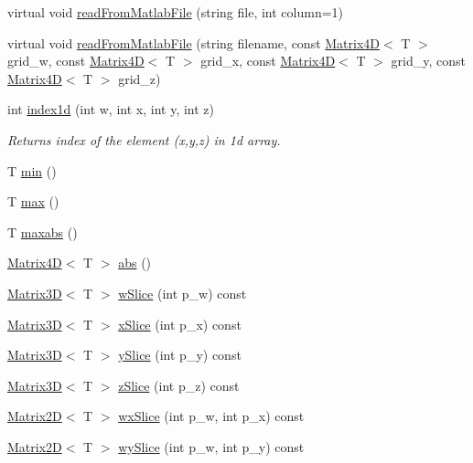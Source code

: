 \begin{DoxyCompactItemize}
\item 
virtual void \hyperlink{class_matrix4_d_af931115c686508ca52ba31085aac6cda}{read\+From\+Matlab\+File} (string file, int column=1)
\item 
virtual void \hyperlink{class_matrix4_d_ae53e29f2daa8b6c2e8f0e9f423e3ec4d}{read\+From\+Matlab\+File} (string filename, const \hyperlink{class_matrix4_d}{Matrix4\+D}$<$ T $>$ grid\+\_\+w, const \hyperlink{class_matrix4_d}{Matrix4\+D}$<$ T $>$ grid\+\_\+x, const \hyperlink{class_matrix4_d}{Matrix4\+D}$<$ T $>$ grid\+\_\+y, const \hyperlink{class_matrix4_d}{Matrix4\+D}$<$ T $>$ grid\+\_\+z)
\item 
int \hyperlink{class_matrix4_d_a6e43a921bf8b175fa8c5dac4f7cde2b0}{index1d} (int w, int x, int y, int z)
\begin{DoxyCompactList}\small\item\em Returns index of the element (x,y,z) in 1d array. \end{DoxyCompactList}\item 
T \hyperlink{class_matrix4_d_a01fb2d7332fb36eee1d62a83b006363a}{min} ()
\item 
T \hyperlink{class_matrix4_d_a9be35a7ac5ae55f677b36cfb7780ba11}{max} ()
\item 
T \hyperlink{class_matrix4_d_a2d79b11ab54ea0139e8c906b684c2e92}{maxabs} ()
\item 
\hyperlink{class_matrix4_d}{Matrix4\+D}$<$ T $>$ \hyperlink{class_matrix4_d_a509523c38195386b22e5090a54110f1d}{abs} ()
\item 
\hyperlink{class_matrix3_d}{Matrix3\+D}$<$ T $>$ \hyperlink{class_matrix4_d_a1f3fda217638aa820a58897e61df453c}{w\+Slice} (int p\+\_\+w) const 
\item 
\hyperlink{class_matrix3_d}{Matrix3\+D}$<$ T $>$ \hyperlink{class_matrix4_d_ae5b5f2af42ad24ef1cb78fd2f0464de1}{x\+Slice} (int p\+\_\+x) const 
\item 
\hyperlink{class_matrix3_d}{Matrix3\+D}$<$ T $>$ \hyperlink{class_matrix4_d_a589165bb5d351369b487a0d496bf98ae}{y\+Slice} (int p\+\_\+y) const 
\item 
\hyperlink{class_matrix3_d}{Matrix3\+D}$<$ T $>$ \hyperlink{class_matrix4_d_ac6f111b358f368a9f521a633b76d70bb}{z\+Slice} (int p\+\_\+z) const 
\item 
\hyperlink{class_matrix2_d}{Matrix2\+D}$<$ T $>$ \hyperlink{class_matrix4_d_a8b08f01c13516a0dcad6a2f6a2aa7303}{wx\+Slice} (int p\+\_\+w, int p\+\_\+x) const 
\item 
\hyperlink{class_matrix2_d}{Matrix2\+D}$<$ T $>$ \hyperlink{class_matrix4_d_a83be407dd3659769eb1c7e1e5c2a6e13}{wy\+Slice} (int p\+\_\+w, int p\+\_\+y) const 

\end{DoxyCompactItemize}
